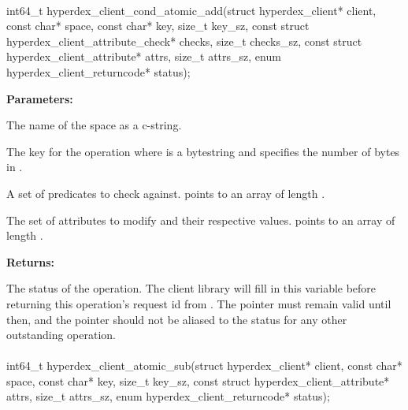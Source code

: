 \paragraph{}
\label{api:c:cond_atomic_add}
\begin{ccode}
int64_t hyperdex_client_cond_atomic_add(struct hyperdex_client* client,
                const char* space,
                const char* key, size_t key_sz,
                const struct hyperdex_client_attribute_check* checks, size_t checks_sz,
                const struct hyperdex_client_attribute* attrs, size_t attrs_sz,
                enum hyperdex_client_returncode* status);
\end{ccode}
\funcdesc 

\noindent\textbf{Parameters:}
\begin{description}[labelindent=\widthof{{\code{checks}, \code{checks\_sz}}},leftmargin=*,noitemsep,nolistsep,align=right]
\item[\code{space}] The name of the space as a c-string.
\item[\code{key}, \code{key\_sz}] The key for the operation where  is a bytestring and  specifies the number of bytes in .
\item[\code{checks}, \code{checks\_sz}] A set of predicates to check against.   points to an array of length .
\item[\code{attrs}, \code{attrs\_sz}] The set of attributes to modify and their respective values.   points to an array of length .
\end{description}

\noindent\textbf{Returns:}
\begin{description}[labelindent=\widthof{{\code{status}}},leftmargin=*,noitemsep,nolistsep,align=right]
\item[\code{status}] The status of the operation.  The client library will fill in this variable before returning this operation's request id from .  The pointer must remain valid until then, and the pointer should not be aliased to the status for any other outstanding operation.
\end{description}

\paragraph{}
\label{api:c:atomic_sub}
\begin{ccode}
int64_t hyperdex_client_atomic_sub(struct hyperdex_client* client,
                const char* space,
                const char* key, size_t key_sz,
                const struct hyperdex_client_attribute* attrs, size_t attrs_sz,
                enum hyperdex_client_returncode* status);
\end{ccode}
\funcdesc 

